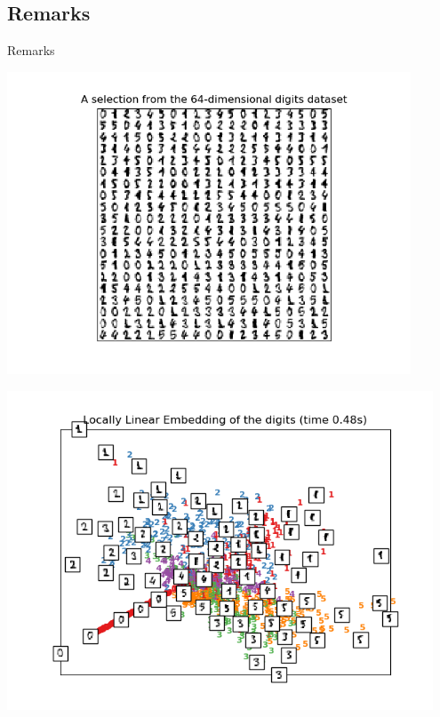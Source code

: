 \subsection{Remarks}

\begin{frame}{Remarks}


\begin{minipage}{0.47\textwidth}
\begin{center}
	\includegraphics[width=0.9\textwidth]{img/digits}
\end{center}
\end{minipage}
\begin{minipage}{0.47\textwidth}
\begin{center}
	\includegraphics[width=0.95\textwidth]{img/digits_lle}
\end{center}
\end{minipage}


\end{frame}
